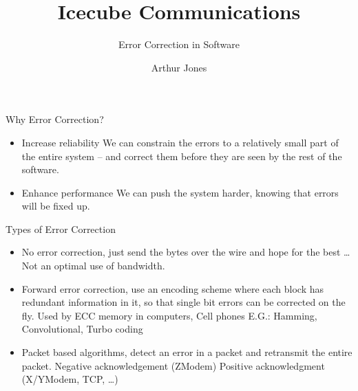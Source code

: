 \documentclass[pdf,serpaggi,slideColor,colorBG]{prosper}
\title{Icecube Communications}
\subtitle{Error Correction in Software}
\author{Arthur Jones}
\begin{document}
\maketitle

\begin{slide}{Why Error Correction?}
\begin{itemize}

\item Increase reliability
\subitem We can constrain the errors to a relatively small part
of the entire system -- and correct them before they are seen
by the rest of the software.

\item Enhance performance
\subitem We can push the system harder, knowing that errors
will be fixed up.

\end{itemize}
\end{slide}

\begin{slide}{Types of Error Correction}
\begin{itemize}

\item No error correction, just send the bytes over the wire
and hope for the best \ldots
\subitem Not an optimal use of bandwidth.

\item Forward error correction, use an encoding scheme
where each block has redundant information in it, so that single
bit errors can be corrected on the fly.
\subitem Used by ECC memory in computers, Cell phones
\subitem E.G.: Hamming, Convolutional, Turbo coding

\item Packet based algorithms, detect an error in a packet
and retransmit the entire packet.
\subitem Negative acknowledgement (ZModem)
\subitem Positive acknowledgment (X/YModem, TCP, \ldots)

\end{itemize}
\end{slide}
\end{document}
